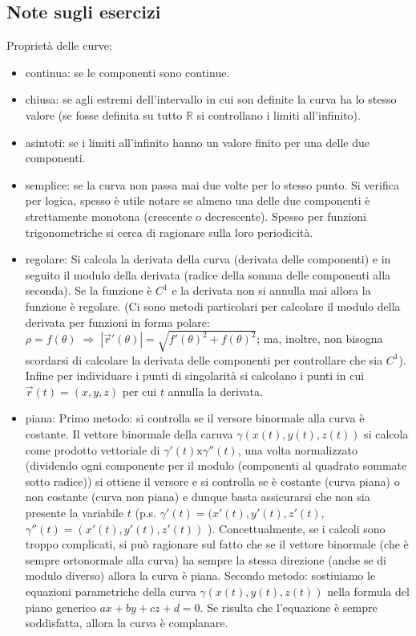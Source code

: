 \subsection*{Note sugli esercizi}
\begin{tcolorbox}
Proprietà delle curve:
\begin{itemize}
    \item continua: se le componenti sono continue.
    \item chiusa: se agli estremi dell'intervallo in cui son definite la curva ha lo stesso valore (se fosse definita su tutto $\mathbb{R}$ si controllano i limiti all'infinito).
    \item asintoti: se i limiti all'infinito hanno un valore finito per una delle due componenti.
    \item semplice: se la curva non passa mai due volte per lo stesso punto. Si verifica per logica, spesso è utile notare se almeno una delle due componenti è strettamente monotona (crescente o decrescente). Spesso per funzioni trigonometriche si cerca di ragionare sulla loro periodicità.
    \item regolare: Si calcola la derivata della curva (derivata delle componenti) e in seguito il modulo della derivata (radice della somma delle componenti alla seconda). Se la funzione è $C^1$ e la derivata non si annulla mai allora la funzione è regolare. (Ci sono metodi particolari per calcolare il modulo della derivata per funzioni in forma polare: $\rho = f(\theta) \; \Rightarrow \; |\vec{r}'(\theta)| = \sqrt{f'(\theta)^2 + f(\theta)^2}$; ma, inoltre, non bisogna scordarsi di calcolare la derivata delle componenti per controllare che sia $C^1$).\newline
    Infine per individuare i punti di singolarità si calcolano i punti in cui $\vec{r}(t) = (x,y,z)$ per cui $t$ annulla la derivata.
    \item piana: \newline
    Primo metodo: si controlla se il versore binormale alla curva è costante. Il vettore binormale della caruva $\gamma(x(t), y(t), z(t))$ si calcola come prodotto vettoriale di $\gamma'(t) \text{x} \gamma''(t)$, una volta normalizzato (dividendo ogni componente per il modulo (componenti al quadrato sommate sotto radice)) si ottiene il versore e si controlla se è costante (curva piana) o non costante (curva non piana) e dunque basta assicurarsi che non sia presente la variabile $t$ (p.s. $\gamma'(t) = (x'(t), y'(t), z'(t)$, $\gamma''(t) = (x'(t), y'(t), z'(t))$ ). Concettualmente, se i calcoli sono troppo complicati, si può ragionare sul fatto che se il vettore binormale (che è sempre ortonormale alla curva) ha sempre la stessa direzione (anche se di modulo diverso) allora la curva è piana.\newline
    Secondo metodo: sostiuiamo le equazioni parametriche della curva $\gamma(x(t), y(t), z(t))$ nella formula del piano generico $ax + by +cz + d = 0$. Se risulta che l'equazione è sempre soddisfatta, allora la curva è complanare.
\end{itemize}
\end{tcolorbox}

